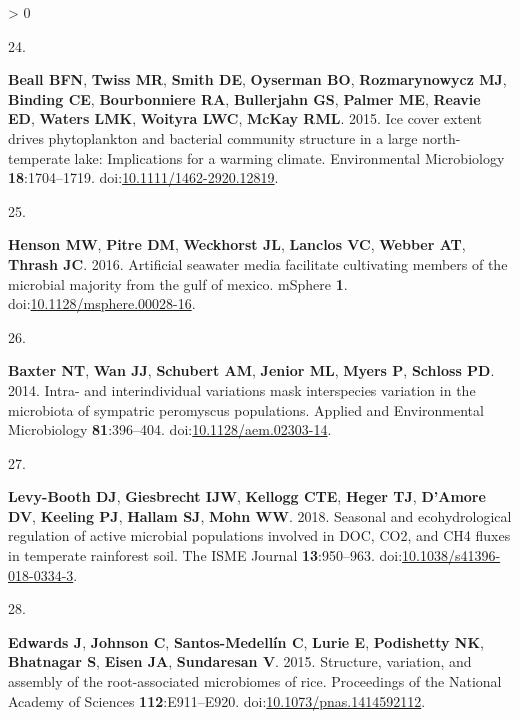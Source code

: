\documentclass[
]{article}
\newlength{\cslhangindent}
\newlength{\csllabelwidth}
\newenvironment{CSLReferences}[3] %
 {%
  \setlength{\parindent}{0pt}
  \ifodd #1 \everypar{\setlength{\hangindent}{\cslhangindent}}\ignorespaces\fi
  \ifnum #2 > 0
  \setlength{\parskip}{#2\baselineskip}
  \fi
 }%
 {}
\newcommand{\CSLLeftMargin}[1]{\parbox[t]{\csllabelwidth}{#1}}
\newcommand{\CSLRightInline}[1]{\parbox[t]{\linewidth - \csllabelwidth}{#1}}
\begin{document}
\begin{CSLReferences}{0}{0}
\leavevmode\hypertarget{ref-Beall2015}{}%
\CSLLeftMargin{24. }
\CSLRightInline{\textbf{Beall BFN}, \textbf{Twiss MR}, \textbf{Smith
DE}, \textbf{Oyserman BO}, \textbf{Rozmarynowycz MJ}, \textbf{Binding
CE}, \textbf{Bourbonniere RA}, \textbf{Bullerjahn GS}, \textbf{Palmer
ME}, \textbf{Reavie ED}, \textbf{Waters LMK}, \textbf{Woityra LWC},
\textbf{McKay RML}. 2015. Ice cover extent drives phytoplankton and
bacterial community structure in a large north-temperate lake:
Implications for a warming climate. Environmental Microbiology
\textbf{18}:1704--1719.
doi:\href{https://doi.org/10.1111/1462-2920.12819}{10.1111/1462-2920.12819}.}

\leavevmode\hypertarget{ref-Henson2016}{}%
\CSLLeftMargin{25. }
\CSLRightInline{\textbf{Henson MW}, \textbf{Pitre DM}, \textbf{Weckhorst
JL}, \textbf{Lanclos VC}, \textbf{Webber AT}, \textbf{Thrash JC}. 2016.
Artificial seawater media facilitate cultivating members of the
microbial majority from the gulf of mexico. {mSphere} \textbf{1}.
doi:\href{https://doi.org/10.1128/msphere.00028-16}{10.1128/msphere.00028-16}.}

\leavevmode\hypertarget{ref-Baxter2014}{}%
\CSLLeftMargin{26. }
\CSLRightInline{\textbf{Baxter NT}, \textbf{Wan JJ}, \textbf{Schubert
AM}, \textbf{Jenior ML}, \textbf{Myers P}, \textbf{Schloss PD}. 2014.
Intra- and interindividual variations mask interspecies variation in the
microbiota of sympatric peromyscus populations. Applied and
Environmental Microbiology \textbf{81}:396--404.
doi:\href{https://doi.org/10.1128/aem.02303-14}{10.1128/aem.02303-14}.}

\leavevmode\hypertarget{ref-LevyBooth2018}{}%
\CSLLeftMargin{27. }
\CSLRightInline{\textbf{Levy-Booth DJ}, \textbf{Giesbrecht IJW},
\textbf{Kellogg CTE}, \textbf{Heger TJ}, \textbf{D'Amore DV},
\textbf{Keeling PJ}, \textbf{Hallam SJ}, \textbf{Mohn WW}. 2018.
Seasonal and ecohydrological regulation of active microbial populations
involved in {DOC}, {CO}2, and {CH}4 fluxes in temperate rainforest soil.
The {ISME} Journal \textbf{13}:950--963.
doi:\href{https://doi.org/10.1038/s41396-018-0334-3}{10.1038/s41396-018-0334-3}.}

\leavevmode\hypertarget{ref-Edwards2015}{}%
\CSLLeftMargin{28. }
\CSLRightInline{\textbf{Edwards J}, \textbf{Johnson C},
\textbf{Santos-Medellín C}, \textbf{Lurie E}, \textbf{Podishetty NK},
\textbf{Bhatnagar S}, \textbf{Eisen JA}, \textbf{Sundaresan V}. 2015.
Structure, variation, and assembly of the root-associated microbiomes of
rice. Proceedings of the National Academy of Sciences
\textbf{112}:E911--E920.
doi:\href{https://doi.org/10.1073/pnas.1414592112}{10.1073/pnas.1414592112}.}


\end{CSLReferences}
\end{document}
